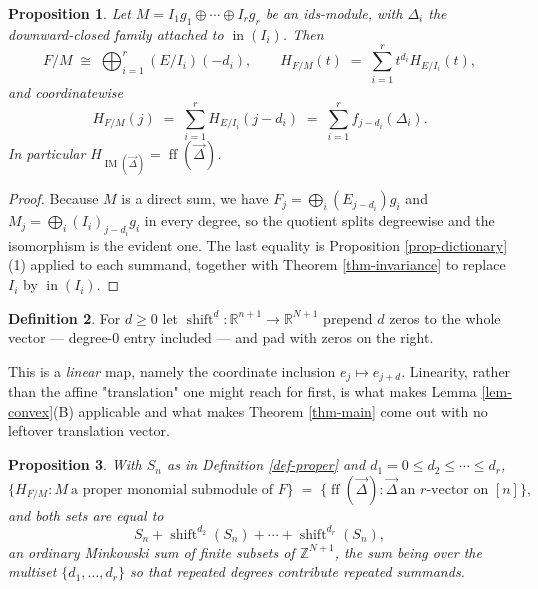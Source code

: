 \documentclass[11pt, a4paper, abstract=yes]{scrartcl}
\theoremstyle{definition}
\newtheorem{definition}{Definition}
\theoremstyle{remark}
\theoremstyle{plain}
\newtheorem{proposition}[definition]{Proposition}
\newcommand{\shift}{\operatorname{shift}}
\newcommand{\ff}{\operatorname{ff}}
\newcommand{\IM}{\operatorname{IM}}
\newcommand{\inn}{\operatorname{in}}
\begin{document}
\begin{proposition}
Let \(M=I_1g_1\oplus\cdots\oplus I_rg_r\) be an ids-module, with \(\Delta_i\) the downward-closed
family attached to \(\inn(I_i)\). Then
\begin{equation}\label{eq:splitting}
  F/M\;\cong\;\bigoplus_{i=1}^{r}(E/I_i)(-d_i),
  \qquad H_{F/M}(t)\;=\;\sum_{i=1}^{r}t^{d_i}H_{E/I_i}(t),
\end{equation}
and coordinatewise
\begin{equation}\label{eq:splitting-2}
  H_{F/M}(j)\;=\;\sum_{i=1}^{r}H_{E/I_i}(j-d_i)\;=\;\sum_{i=1}^{r}f_{j-d_i}(\Delta_i).
\end{equation}
In particular \(H_{\IM(\vec\Delta)}=\ff(\vec\Delta)\).
\label{prop:splitting}
\label{prop-splitting}
\end{proposition}

\begin{proof}
Because \(M\) is a direct sum, we have \(F_j=\bigoplus_i(E_{j-d_i})g_i\) and
\(M_j=\bigoplus_i(I_i)_{j-d_i}g_i\) in every degree, so the quotient splits degreewise and the
isomorphism is the evident one. The last
equality is Proposition \ref{prop-dictionary}(1) applied to each summand, together with
Theorem \ref{thm-invariance} to replace \(I_i\) by \(\inn(I_i)\).
\end{proof}

\begin{definition}
For \(d\ge0\) let \(\shift^d:\mathbb R^{n+1}\to\mathbb R^{N+1}\) prepend \(d\) zeros to the whole
vector --- degree-\(0\) entry included --- and pad with zeros on the right.
\label{def-shift}
\end{definition}

This is a \emph{linear} map, namely the coordinate inclusion \(e_j\mapsto e_{j+d}\). Linearity, rather
than the affine "translation" one might reach for first, is what makes Lemma \ref{lem-convex}(B)
applicable and what makes Theorem \ref{thm-main} come out with no leftover translation vector.

\begin{proposition}
With \(S_n\) as in Definition \ref{def-proper} and \(d_1=0\le d_2\le\cdots\le d_r\),
\begin{equation}\label{eq:sumset}
  \bigl\lbrace H_{F/M}: M\ \text{a proper monomial submodule of }F\bigr\rbrace
  \;=\;\bigl\lbrace\ff(\vec\Delta):\vec\Delta\ \text{an }r\text{-vector on }[n]\bigr\rbrace,
\end{equation}
and both sets are equal to
\begin{equation}\label{eq:sumset-2}
  S_n+\shift^{d_2}(S_n)+\cdots+\shift^{d_r}(S_n),
\end{equation}
an ordinary Minkowski sum of finite subsets of \(\mathbb Z^{N+1}\), the sum being over the \emph{multiset}
\(\lbrace d_1,\dots,d_r\rbrace\) so that repeated degrees contribute repeated summands.
\label{prop:sumset}
\label{prop-sumset}
\end{proposition}
\end{document}
